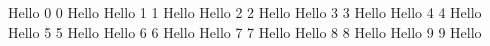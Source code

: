 \documentclass[12pt]{article}
\begin{document}
Hello 0
0 Hello
\newpage
Hello 1
1 Hello
\newpage
Hello 2
2 Hello
\newpage
Hello 3
3 Hello
\newpage
Hello 4
4 Hello
\newpage
Hello 5
5 Hello
\newpage
Hello 6
6 Hello
\newpage
Hello 7
7 Hello
\newpage
Hello 8
8 Hello
\newpage
Hello 9
9 Hello
\newpage
\end{document}
